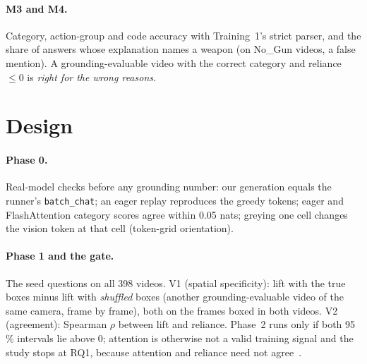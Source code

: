 \documentclass[11pt]{article}
\begin{document}
\paragraph{M3 and M4.} Category, action-group and code accuracy with Training~1's strict parser, and the share of answers whose explanation names a weapon (on No\_Gun videos, a false mention). A grounding-evaluable video with the correct category and reliance $\le 0$ is \emph{right for the wrong reasons}.

\section{Design}
\paragraph{Phase 0.} Real-model checks before any grounding number: our generation equals the runner's \texttt{batch\_chat}; an eager replay reproduces the greedy tokens; eager and FlashAttention category scores agree within 0.05 nats; greying one cell changes the vision token at that cell (token-grid orientation).

\paragraph{Phase 1 and the gate.} The seed questions on all 398 videos. V1 (spatial specificity): lift with the true boxes minus lift with \emph{shuffled} boxes (another grounding-evaluable video of the same camera, frame by frame), both on the frames boxed in both videos. V2 (agreement): Spearman $\rho$ between lift and reliance. Phase~2 runs only if both 95\,\% intervals lie above 0; attention is otherwise not a valid training signal and the study stops at RQ1, because attention and reliance need not agree~\cite{jain2019attention}.
\end{document}
